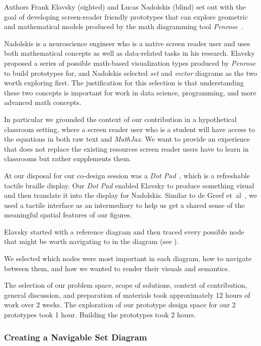 \documentclass[12pt]{cmuthesis}
\newcommand{\ea}{{et~al\xperiod}\xspace}
\begin{document}
Authors Frank Elavsky (sighted) and Lucas Nadolskis (blind) set out with the goal of developing screen-reader friendly prototypes that can explore geometric and mathematical models produced by the math diagramming tool \textit{Penrose}~\cite{Ye2020Penrose}.

Nadolskis is a neuroscience engineer who is a native screen reader user and uses both mathematical concepts as well as data-related tasks in his research. Elavsky proposed a series of possible math-based visualization types produced by \textit{Penrose} to build prototypes for, and Nadolskis selected \textit{set} and \textit{vector} diagrams as the two worth exploring first. The justification for this selection is that understanding these two concepts is important for work in data science, programming, and more advanced math concepts.

In particular we grounded the context of our contribution in a hypothetical classroom setting, where a screen reader user who is a student will have access to the equations in both raw text and \textit{MathJax}. We want to provide an experience that does not replace the existing resources screen reader users have to learn in classrooms but rather supplements them.

At our disposal for our co-design session was a \textit{Dot Pad}~\cite{Dot2020Dot}, which is a refreshable tactile braille display. Our \textit{Dot Pad} enabled Elavsky to produce something visual and then translate it into the display for Nadolskis. Similar to de Greef \ea~\cite{deGreef2021Interdependent}, we used a tactile interface as an intermediary to help us get a shared sense of the meaningful spatial features of our figures.

Elavsky started with a reference diagram and then traced every possible node that might be worth navigating to in the diagram (see ).

We selected which nodes were most important in each diagram, how to navigate between them, and how we wanted to render their visuals and semantics.

The selection of our problem space, scope of solutions, context of contribution, general discussion, and preparation of materials took approximately 12 hours of work over 2 weeks. The exploration of our prototype design space for our 2 prototypes took 1 hour. Building the prototypes took 2 hours.

\subsubsection{Creating a Navigable Set Diagram}
\end{document}
